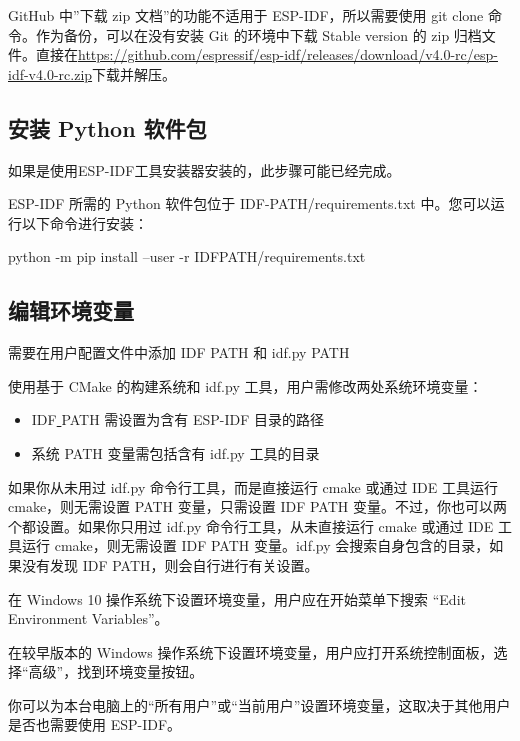 GitHub 中”下载 zip 文档”的功能不适用于 ESP-IDF，所以需要使用 git clone 命令。作为备份，可以在没有安装 Git 的环境中下载 Stable version 的 zip 归档文件。直接在\url{https://github.com/espressif/esp-idf/releases/download/v4.0-rc/esp-idf-v4.0-rc.zip}下载并解压。

\subsection{安装 Python 软件包}

如果是使用ESP-IDF工具安装器安装的，此步骤可能已经完成。

ESP-IDF 所需的 Python 软件包位于 IDF-PATH/requirements.txt 中。您可以运行以下命令进行安装：


\begin{tcolorbox}
    python -m pip install --user -r IDFPATH/requirements.txt
\end{tcolorbox}

\subsection{编辑环境变量}

需要在用户配置文件中添加 IDF PATH 和 idf.py PATH

使用基于 CMake 的构建系统和 idf.py 工具，用户需修改两处系统环境变量：

\begin{itemize}
    \item IDF\underline{ }PATH 需设置为含有 ESP-IDF 目录的路径
    \item 系统 PATH 变量需包括含有 idf.py 工具的目录
\end{itemize}

如果你从未用过 idf.py 命令行工具，而是直接运行 cmake 或通过 IDE 工具运行 cmake，则无需设置 PATH 变量，只需设置 IDF PATH 变量。不过，你也可以两个都设置。如果你只用过 idf.py 命令行工具，从未直接运行 cmake 或通过 IDE 工具运行 cmake，则无需设置 IDF PATH 变量。idf.py 会搜索自身包含的目录，如果没有发现 IDF PATH，则会自行进行有关设置。

在 Windows 10 操作系统下设置环境变量，用户应在开始菜单下搜索 “Edit Environment Variables”。

在较早版本的 Windows 操作系统下设置环境变量，用户应打开系统控制面板，选择“高级”，找到环境变量按钮。

你可以为本台电脑上的“所有用户”或“当前用户”设置环境变量，这取决于其他用户是否也需要使用 ESP-IDF。

